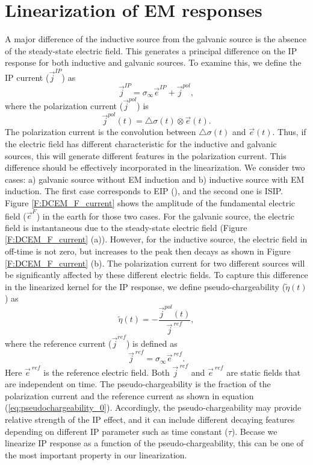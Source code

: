 \documentclass[a4paper, 11pt]{article}
\newcommand{\siginf}{\sigma_\infty}
\newcommand{\dsig}{\triangle\sigma}
\renewcommand {\j}  { {\vec j} }
\newcommand {\e}  { {\vec e} }
\newcommand{\peta}{\tilde{\eta}}
\newcommand{\eref}{\e^{\ ref}}
\begin{document}
\section{Linearization of EM responses}
A major difference of the inductive source from the galvanic source is the absence of the steady-state electric field. 
This generates a principal difference on the IP response for both inductive and galvanic sources. 
To examine this, we define the IP current ($\j^{IP}$) as
\begin{equation}
  \j^{IP} = \siginf \e^{IP} + \j^{pol},
  \label{eq:IP_current}
\end{equation}
where the polarization current ($\j^{pol}$) is
\begin{equation}
  \j^{pol}(t) = \dsig(t) \otimes \e(t).
  \label{eq:polarization_current}
\end{equation}
The polarization current is the convolution between $\dsig (t)$ and $\e(t)$. 
Thus, if the electric field has different characteristic for the inductive and galvanic sources, this will generate different features in the polarization current.
This difference should be effectively incorporated in the linearization. 
We consider two cases: a) galvanic source without EM induction and b) inductive source with EM induction. The first case corresponds to EIP (\cite{seigel1959}), and the second one is ISIP.
Figure \ref{F:DCEM_F_current} shows the amplitude of the fundamental electric field ($\e^{F}$) in the earth for those two cases. 
For the galvanic source, the electric field is instantaneous due to the steady-state electric field (Figure \ref{F:DCEM_F_current} (a)). 
However, for the inductive source, the electric field in off-time is not zero, but increases to the peak then decays as shown in Figure \ref{F:DCEM_F_current} (b). 
The polarization current for two different sources will be significantly affected by these different electric fields. 
To capture this difference in the linearized kernel for the IP response, we define pseudo-chargeability ($\peta(t)$) as 
\begin{equation}
  \peta(t) = -\frac{\j^{pol}(t)}{\j^{\ ref}},
  \label{eq:pseudochargeability_0}
\end{equation}
where the reference current ($\j^{ref}$) is defined as 
\begin{equation}
  \j^{\ ref} = \siginf \eref.
  \label{eq:reference_current}
\end{equation}
Here $\eref$ is the reference electric field. 
Both $\j^{\ ref}$ and $\eref$ are static fields that are independent on time. 
The pseudo-chargeability is the fraction of the polarization current and the reference current as shown in equation (\ref{eq:pseudochargeability_0}). 
Accordingly, the pseudo-chargeability may provide relative strength of the IP effect, and it can include different decaying features depending on different IP parameter such as time constant ($\tau$). Becase we linearize IP response as a function of the pseudo-chargeability, this can be one of the most important property in our linearization. 
\end{document}
